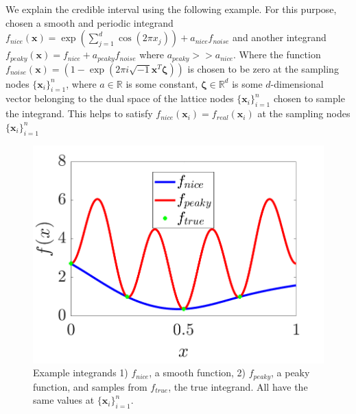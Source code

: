 \documentclass{iitthesis}          %
\newcommand{\bm}[1]{\boldsymbol{#1}}
\newcommand{\vzeta}{{\bm{\zeta}}}
\newcommand{\vx}{\bm{x}}
\begin{document}
We explain the credible interval using the following example. For this purpose, chosen a smooth and periodic integrand $f_{nice}(\vx) = \exp(\sum_{j=1}^{d} \cos(2\pi x_j)) + a_{nice} f_{noise}$ and another integrand $f_{peaky}(\vx) = f_{nice} + a_{peaky} f_{noise}$ where $a_{peaky} >> a_{nice}$. Where the function $f_{noise}(\vx) = (1 - \exp(2\pi i \sqrt{-1} \vx^T \vzeta))$ is chosen to be zero at the sampling nodes $\{ \vx_i\}_{i=1}^n$, where $a \in \mathbb{R}$ is some constant, $\vzeta \in \mathbb{R}^d$ is some $d$-dimensional vector belonging to the dual space of the lattice nodes $\{ \vx_i\}_{i=1}^n$ chosen to sample the integrand. This helps to satisfy $f_{nice}(\vx_i) = f_{real}(\vx_i) $ at the sampling nodes $\{ \vx_i\}_{i=1}^n$


\begin{figure}[ht]
	\centering
	\includegraphics[width=0.9\linewidth]{cone_bayes_f_real}
	\caption{Example integrands 1) $f_{nice}$, a smooth function, 2) $f_{peaky}$, a peaky function, and samples from $f_{true}$, the true integrand. All have the same values at $\{\vx_i\}_{i=1}^n$.}
	\label{fig:cone_bayes_functions}
\end{figure}
\end{document}
